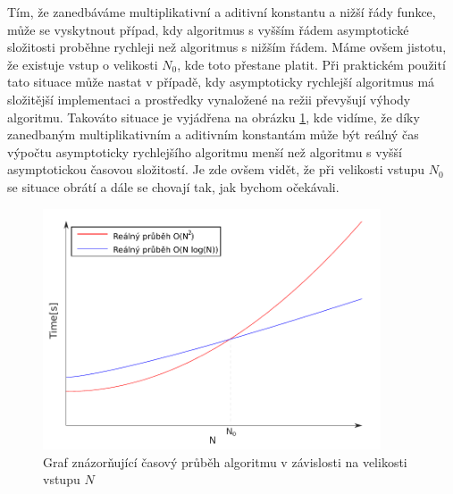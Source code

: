 	Tím, že zanedbáváme multiplikativní a aditivní konstantu a nižší řády funkce, může se vyskytnout případ, kdy algoritmus s vyšším řádem asymptotické složitosti proběhne rychleji než algoritmus s nižším řádem. Máme ovšem jistotu, že existuje vstup o velikosti $N_0$, kde toto přestane platit. Při praktickém použití tato situace může nastat v případě, kdy asymptoticky rychlejší algoritmus má složitější implementaci a prostředky vynaložené na režii převyšují výhody algoritmu. Takováto situace je vyjádřena na obrázku \ref{fig:4-time_complexity}, kde vidíme, že díky zanedbaným multiplikativním a aditivním konstantám může být reálný čas výpočtu asymptoticky rych\-lej\-ší\-ho algoritmu menší než algoritmu s vyšší asymptotickou časovou složitostí. Je zde ovšem vidět, že při velikosti vstupu $N_0$ se situace obrátí a dále se chovají tak, jak bychom očekávali.\cite{hartmanis1965on}
	
\begin{figure}[h]
  \centering
  \includegraphics[width=10cm]{./pictures/4/time_complexity.pdf}
  \caption{Graf znázorňující časový průběh algoritmu v závislosti na velikosti vstupu $N$}
  \label{fig:4-time_complexity}
\end{figure}
	
